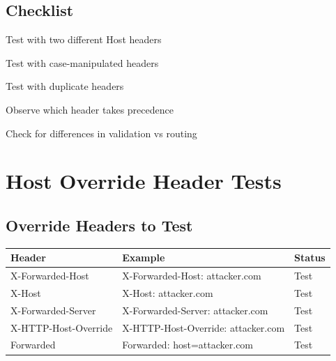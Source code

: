 \documentclass[12pt,a4paper]{article}
\begin{document}
\subsection{Checklist}
\begin{checklistbox}
 Test with two different Host headers
\end{checklistbox}
\begin{checklistbox}
 Test with case-manipulated headers
\end{checklistbox}
\begin{checklistbox}
 Test with duplicate headers
\end{checklistbox}
\begin{checklistbox}
 Observe which header takes precedence
\end{checklistbox}
\begin{checklistbox}
 Check for differences in validation vs routing
\end{checklistbox}

\section{Host Override Header Tests}

\subsection{Override Headers to Test}
\begin{longtable}{|p{4cm}|p{6cm}|p{4cm}|}
    \hline
    \textbf{Header} & \textbf{Example} & \textbf{Status} \\
    \hline
    X-Forwarded-Host & X-Forwarded-Host: attacker.com & Test \\
    \hline
    X-Host & X-Host: attacker.com & Test \\
    \hline
    X-Forwarded-Server & X-Forwarded-Server: attacker.com & Test \\
    \hline
    X-HTTP-Host-Override & X-HTTP-Host-Override: attacker.com & Test \\
    \hline
    Forwarded & Forwarded: host=attacker.com & Test \\
    \hline
\end{longtable}
\end{document}
